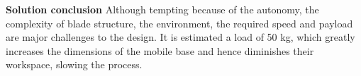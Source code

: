 




\textbf{Solution conclusion}
Although tempting because of the autonomy, the complexity of blade structure,
the environment, the required speed and payload are
major challenges to the design. It is estimated a load of 50 kg, which greatly increases the
dimensions of the mobile base and hence diminishes their workspace,
slowing the process.

